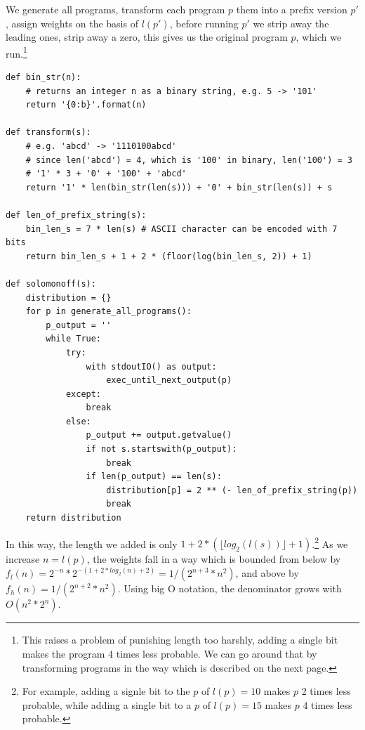 We generate all programs, transform each program $p$ them into a prefix version $p'$, assign weights on the basis of $l(p')$, before running $p'$ we strip away the leading ones, strip away a zero, this gives us the original program $p$, which we run.\footnote{
This raises a problem of punishing length too harshly, adding a single bit makes the program 4 times less probable.
We can go around that by transforming programs in the way which is described on the next page.
}

\newpage

\begin{lstlisting}[caption={Algorithmic induction with weights being assigned on the basis of a prefix-coded program. Note that nothing is actually being transformed into a prefix string, the only use of it is to assign weights so to guarantee our sum is $\leq 1$. The rest of the functions being referenced in the code snippet here have been introduced a few pages back and they remain unchanged.}]
def bin_str(n):
	# returns an integer n as a binary string, e.g. 5 -> '101'
	return '{0:b}'.format(n)

def transform(s):
	# e.g. 'abcd' -> '1110100abcd'
	# since len('abcd') = 4, which is '100' in binary, len('100') = 3
	# '1' * 3 + '0' + '100' + 'abcd'
	return '1' * len(bin_str(len(s))) + '0' + bin_str(len(s)) + s

def len_of_prefix_string(s):
	bin_len_s = 7 * len(s) # ASCII character can be encoded with 7 bits
	return bin_len_s + 1 + 2 * (floor(log(bin_len_s, 2)) + 1)

def solomonoff(s):
	distribution = {}
	for p in generate_all_programs():
		p_output = ''
		while True:
			try:
				with stdoutIO() as output:
					exec_until_next_output(p)
			except:
				break
			else:
				p_output += output.getvalue()
				if not s.startswith(p_output):
					break
				if len(p_output) == len(s):
					distribution[p] = 2 ** (- len_of_prefix_string(p))
					break
	return distribution
\end{lstlisting}

In this way, the length we added is only $1 + 2 * (\lfloor log_2(l(s)) \rfloor + 1)$.\footnote{For example, adding a signle bit to the $p$ of $l(p) = 10$ makes $p$ 2 times less probable, while adding a single bit to a $p$ of $l(p) = 15$ makes $p$ 4 times less probable.}
As we increase $n = l(p)$, the weights fall in a way which is bounded from below by $f_l(n) = 2^{-n} * 2^{-(1 + 2 * log_2(n) + 2)} = 1 / (2^{n+3} * n^2)$, and above by $f_h(n) = 1 / (2^{n+2} * n^2)$.
Using big O notation, the denominator grows with $O(n^2 * 2^{n})$.


